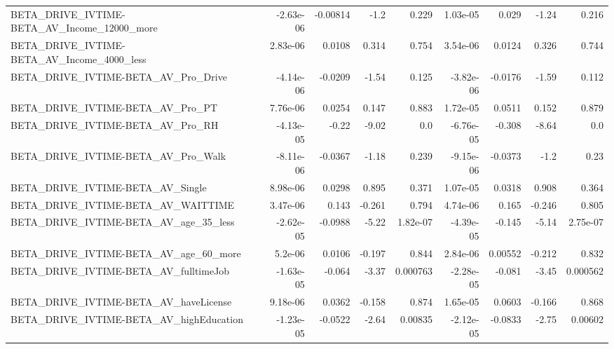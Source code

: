\begin{tabular}{lrrrrrrrr}
BETA\_DRIVE\_IVTIME-BETA\_AV\_Income\_12000\_more        &   -2.63e-06 &     -0.00814 &      -1.2 &    0.229 &   1.03e-05 &       0.029 &        -1.24 &         0.216 \\
BETA\_DRIVE\_IVTIME-BETA\_AV\_Income\_4000\_less         &    2.83e-06 &       0.0108 &     0.314 &    0.754 &   3.54e-06 &      0.0124 &        0.326 &         0.744 \\
BETA\_DRIVE\_IVTIME-BETA\_AV\_Pro\_Drive                &   -4.14e-06 &      -0.0209 &     -1.54 &    0.125 &  -3.82e-06 &     -0.0176 &        -1.59 &         0.112 \\
BETA\_DRIVE\_IVTIME-BETA\_AV\_Pro\_PT                   &    7.76e-06 &       0.0254 &     0.147 &    0.883 &   1.72e-05 &      0.0511 &        0.152 &         0.879 \\
BETA\_DRIVE\_IVTIME-BETA\_AV\_Pro\_RH                   &   -4.13e-05 &        -0.22 &     -9.02 &      0.0 &  -6.76e-05 &      -0.308 &        -8.64 &           0.0 \\
BETA\_DRIVE\_IVTIME-BETA\_AV\_Pro\_Walk                 &   -8.11e-06 &      -0.0367 &     -1.18 &    0.239 &  -9.15e-06 &     -0.0373 &         -1.2 &          0.23 \\
BETA\_DRIVE\_IVTIME-BETA\_AV\_Single                   &    8.98e-06 &       0.0298 &     0.895 &    0.371 &   1.07e-05 &      0.0318 &        0.908 &         0.364 \\
BETA\_DRIVE\_IVTIME-BETA\_AV\_WAITTIME                 &    3.47e-06 &        0.143 &    -0.261 &    0.794 &   4.74e-06 &       0.165 &       -0.246 &         0.805 \\
BETA\_DRIVE\_IVTIME-BETA\_AV\_age\_35\_less              &   -2.62e-05 &      -0.0988 &     -5.22 & 1.82e-07 &  -4.39e-05 &      -0.145 &        -5.14 &      2.75e-07 \\
BETA\_DRIVE\_IVTIME-BETA\_AV\_age\_60\_more              &     5.2e-06 &       0.0106 &    -0.197 &    0.844 &   2.84e-06 &     0.00552 &       -0.212 &         0.832 \\
BETA\_DRIVE\_IVTIME-BETA\_AV\_fulltimeJob              &   -1.63e-05 &       -0.064 &     -3.37 & 0.000763 &  -2.28e-05 &      -0.081 &        -3.45 &      0.000562 \\
BETA\_DRIVE\_IVTIME-BETA\_AV\_haveLicense              &    9.18e-06 &       0.0362 &    -0.158 &    0.874 &   1.65e-05 &      0.0603 &       -0.166 &         0.868 \\
BETA\_DRIVE\_IVTIME-BETA\_AV\_highEducation            &   -1.23e-05 &      -0.0522 &     -2.64 &  0.00835 &  -2.12e-05 &     -0.0833 &        -2.75 &       0.00602 \\

\end{tabular}
